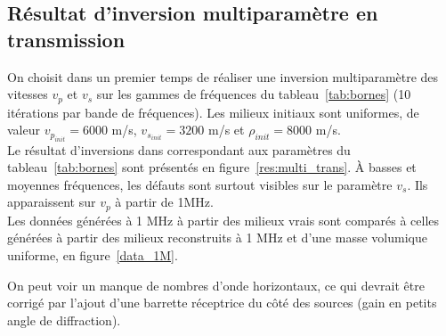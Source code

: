 \documentclass[a4paper,11pt]{report} %
\begin{document}
\subsection{Résultat d'inversion multiparamètre en transmission}

On choisit dans un premier temps de réaliser une inversion multiparamètre des vitesses $v_{p}$ et $v_{s}$ sur les gammes de fréquences du tableau~\ref{tab:bornes} (10 itérations par bande de fréquences). Les milieux initiaux sont uniformes, de valeur $v_{p_{init}}=6000$ m/s, $v_{s_{init}}=3200$ m/s et $\rho_{init} = 8000$ m/s.\\

Le résultat d'inversions dans correspondant aux paramètres du tableau~\ref{tab:bornes} sont présentés en figure~\ref{res:multi_trans}. À basses et moyennes fréquences, les défauts sont surtout visibles sur le paramètre $v_{s}$. Ils apparaissent sur $v_{p}$ à partir de 1MHz. \\

Les données générées à 1 MHz à partir des milieux vrais sont comparés à celles générées à partir des milieux reconstruits à 1 MHz et d'une masse volumique uniforme, en figure~\ref{data_1M}.

On peut voir un manque de nombres d'onde horizontaux, ce qui devrait être corrigé par l'ajout d'une barrette réceptrice du côté des sources (gain en petits angle de diffraction).
\end{document}
